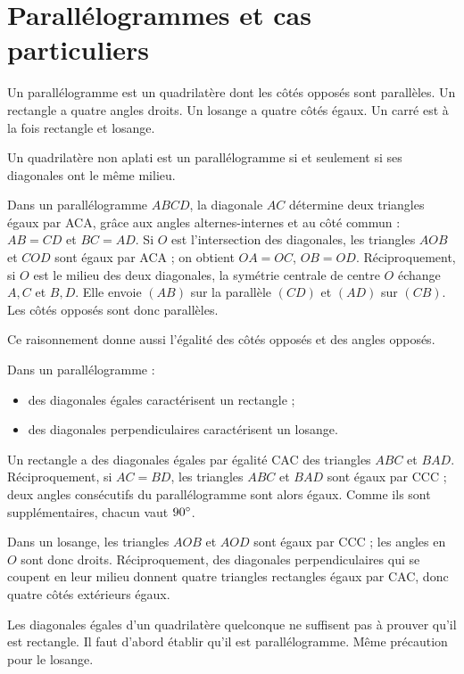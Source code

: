 \documentclass[../cours_3e.tex]{subfiles}
\begin{document}
\section{Parallélogrammes et cas particuliers}
\begin{definition}
Un parallélogramme est un quadrilatère dont les côtés opposés sont parallèles. Un rectangle a quatre angles droits. Un losange a quatre côtés égaux. Un carré est à la fois rectangle et losange.
\end{definition}
\begin{theoreme}[Caractérisation]
Un quadrilatère non aplati est un parallélogramme si et seulement si ses diagonales ont le même milieu.
\end{theoreme}
\begin{demonstration}
Dans un parallélogramme $ABCD$, la diagonale $AC$ détermine deux triangles égaux par ACA, grâce aux angles alternes-internes et au côté commun : $AB=CD$ et $BC=AD$. Si $O$ est l'intersection des diagonales, les triangles $AOB$ et $COD$ sont égaux par ACA ; on obtient $OA=OC$, $OB=OD$.
Réciproquement, si $O$ est le milieu des deux diagonales, la symétrie centrale de centre $O$ échange $A,C$ et $B,D$. Elle envoie $(AB)$ sur la parallèle $(CD)$ et $(AD)$ sur $(CB)$. Les côtés opposés sont donc parallèles.
\end{demonstration}
Ce raisonnement donne aussi l'égalité des côtés opposés et des angles opposés.
\begin{propriete}
Dans un parallélogramme :
\begin{itemize}
\item des diagonales égales caractérisent un rectangle ;
\item des diagonales perpendiculaires caractérisent un losange.
\end{itemize}
\end{propriete}
\begin{demonstration}
Un rectangle a des diagonales égales par égalité CAC des triangles $ABC$ et $BAD$. Réciproquement, si $AC=BD$, les triangles $ABC$ et $BAD$ sont égaux par CCC ; deux angles consécutifs du parallélogramme sont alors égaux. Comme ils sont supplémentaires, chacun vaut $90^{\circ}$.

Dans un losange, les triangles $AOB$ et $AOD$ sont égaux par CCC ; les angles en $O$ sont donc droits. Réciproquement, des diagonales perpendiculaires qui se coupent en leur milieu donnent quatre triangles rectangles égaux par CAC, donc quatre côtés extérieurs égaux.
\end{demonstration}
\begin{attention}
Les diagonales égales d'un quadrilatère quelconque ne suffisent pas à prouver qu'il est rectangle. Il faut d'abord établir qu'il est parallélogramme. Même précaution pour le losange.
\end{attention}
\end{document}
